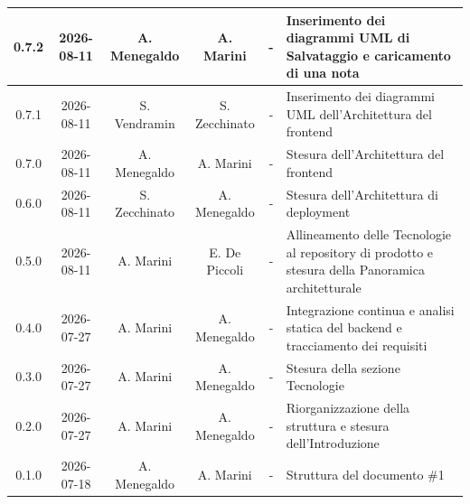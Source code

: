 \documentclass[a4paper, 10pt]{article}
\begin{document}
\begin{longtable}{|c|c|c|c|c|p{3cm}|}
    0.7.2 & 2026-08-11 & A. Menegaldo & A. Marini & - & Inserimento dei diagrammi UML di Salvataggio e caricamento di una nota \\ \hline

    0.7.1 & 2026-08-11 & S. Vendramin & S. Zecchinato & - & Inserimento dei diagrammi UML dell'Architettura del frontend \\ \hline

    0.7.0 & 2026-08-11 & A. Menegaldo & A. Marini & - & Stesura dell'Architettura del frontend \\ \hline

    0.6.0 & 2026-08-11 & S. Zecchinato & A. Menegaldo & - & Stesura dell'Architettura di deployment \\ \hline

    0.5.0 & 2026-08-11 & A. Marini & E. De Piccoli & - & Allineamento delle Tecnologie al repository di prodotto e stesura della Panoramica architetturale \\ \hline

    0.4.0 & 2026-07-27 & A. Marini & A. Menegaldo & - & Integrazione continua e analisi statica del backend e tracciamento dei requisiti \\ \hline

    0.3.0 & 2026-07-27 & A. Marini & A. Menegaldo & - & Stesura della sezione Tecnologie \\ \hline

    0.2.0 & 2026-07-27 & A. Marini & A. Menegaldo & - & Riorganizzazione della struttura e stesura dell'Introduzione \\ \hline

    0.1.0 & 2026-07-18 & A. Menegaldo & A. Marini & - & Struttura del documento \#1 \\ \hline


\end{longtable}
\endgroup

\setcounter{table}{0}

\newpage
\tableofcontents
\newpage

\listoftables
\newpage

\listoffigures
\newpage
\end{document}
